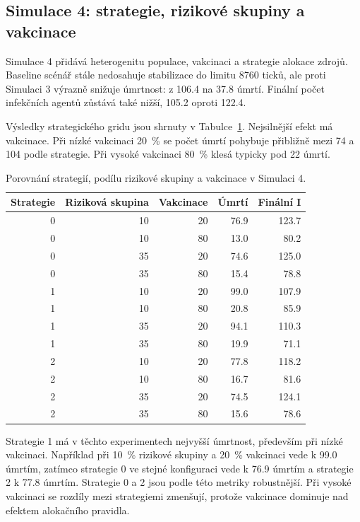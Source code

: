 \documentclass{article}
\begin{document}
\subsection{Simulace 4: strategie, rizikové skupiny a vakcinace}

Simulace 4 přidává heterogenitu populace, vakcinaci a strategie alokace zdrojů.
Baseline scénář stále nedosahuje stabilizace do limitu 8760 ticků, ale proti
Simulaci 3 výrazně snižuje úmrtnost: z 106.4 na 37.8 úmrtí. Finální počet
infekčních agentů zůstává také nižší, 105.2 oproti 122.4.

Výsledky strategického gridu jsou shrnuty v Tabulce~\ref{tab:s4_strategy}.
Nejsilnější efekt má vakcinace. Při nízké vakcinaci 20~\% se počet úmrtí
pohybuje přibližně mezi 74 a 104 podle strategie. Při vysoké vakcinaci 80~\%
klesá typicky pod 22 úmrtí.

\begin{table}[htbp]
\centering
\small
\begin{tabular}{r r r r r}
\hline
\textbf{Strategie} & \textbf{Riziková skupina} & \textbf{Vakcinace} & \textbf{Úmrtí} & \textbf{Finální I} \\
\hline
0 & 10 & 20 & 76.9 & 123.7 \\
0 & 10 & 80 & 13.0 & 80.2 \\
0 & 35 & 20 & 74.6 & 125.0 \\
0 & 35 & 80 & 15.4 & 78.8 \\
1 & 10 & 20 & 99.0 & 107.9 \\
1 & 10 & 80 & 20.8 & 85.9 \\
1 & 35 & 20 & 94.1 & 110.3 \\
1 & 35 & 80 & 19.9 & 71.1 \\
2 & 10 & 20 & 77.8 & 118.2 \\
2 & 10 & 80 & 16.7 & 81.6 \\
2 & 35 & 20 & 74.5 & 124.1 \\
2 & 35 & 80 & 15.6 & 78.6 \\
\hline
\end{tabular}
\caption{Porovnání strategií, podílu rizikové skupiny a vakcinace v Simulaci 4.}
\label{tab:s4_strategy}
\end{table}

Strategie 1 má v těchto experimentech nejvyšší úmrtnost, především při nízké
vakcinaci. Například při 10~\% rizikové skupiny a 20~\% vakcinaci vede k 99.0
úmrtím, zatímco strategie 0 ve stejné konfiguraci vede k 76.9 úmrtím a strategie
2 k 77.8 úmrtím. Strategie 0 a 2 jsou podle této metriky robustnější. Při vysoké
vakcinaci se rozdíly mezi strategiemi zmenšují, protože vakcinace dominuje nad
efektem alokačního pravidla.
\end{document}
